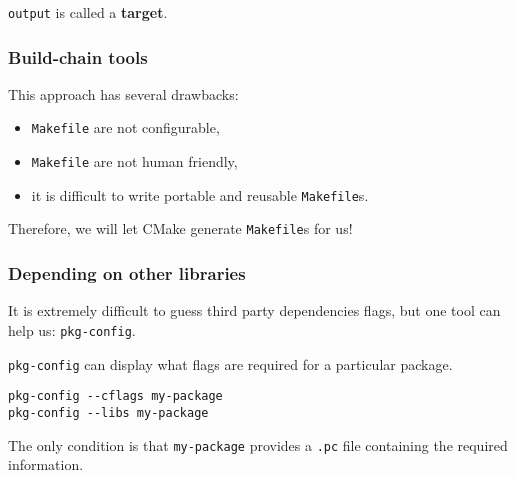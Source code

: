 \documentclass[hyperref={pdfpagelabels=false}]{beamer}
\begin{document}
\texttt{output} is called a \textbf{target}.

\begin{frame}[fragile]
\frametitle{Build-chain tools}

This approach has several drawbacks:

\begin{itemize}
\item \texttt{Makefile} are not configurable,
\item \texttt{Makefile} are not human friendly,
\item it is difficult to write portable and reusable \texttt{Makefile}s.
\end{itemize}

Therefore, we will let CMake generate \texttt{Makefile}s for us!

\end{frame}

\begin{frame}[fragile]
\frametitle{Depending on other libraries}

It is extremely difficult to guess third party dependencies flags, but
one tool can help us: \texttt{pkg-config}.

\vspace{0.2cm}

\texttt{pkg-config} can display what flags are required for a
particular package.

\begin{verbatim}
pkg-config --cflags my-package
pkg-config --libs my-package
\end{verbatim}

The only condition is that \texttt{my-package} provides a \texttt{.pc}
file containing the required information.
\end{frame}
\end{document}
